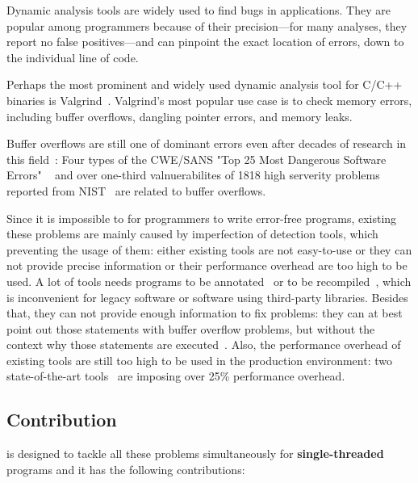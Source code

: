 
Dynamic analysis tools are widely used to find bugs in
applications. They are popular among programmers because of their
precision---for many analyses, they report no false positives---and
can pinpoint the exact location of errors, down to the individual line
of code.

Perhaps the most prominent and widely used dynamic analysis tool for
C/C++ binaries is Valgrind~\cite{}. Valgrind's most popular use case
is to check memory errors, including buffer overflows, dangling
pointer errors, and memory leaks.


Buffer overflows are still one of dominant errors 
even after decades of research in this field~\cite{}: 
Four types of the CWE/SANS "Top 25 Most Dangerous Software Errors" 
~\cite{overflows1} and 
over one-third valnuerabilites of 1818 high serverity problems
reported from NIST~\cite{overflows2} are related to buffer overflows.

Since it is impossible to for programmers to write error-free programs, 
existing these problems are mainly caused by imperfection
of detection tools, which preventing the usage of them: 
either existing tools are not easy-to-use or they can not provide precise information 
or their performance
overhead are too high to be used.
A lot of tools needs programs to be annotated~\cite{} or to be recompiled~\cite{}, 
which is inconvenient for legacy software or software using third-party libraries.
Besides that, they can not provide enough information to fix problems: they can
at best point out those statements with buffer overflow problems, but without the context
why those statements are executed~\cite{}. 
Also, the performance overhead of existing tools are still too high to be
used in the production environment: two state-of-the-art tools~\cite{} are imposing over 25\%
performance overhead. 

\subsection{Contribution}
\doubletake{} is designed to tackle all these problems simultaneously for \textbf{single-threaded}
programs and it has the following contributions:

